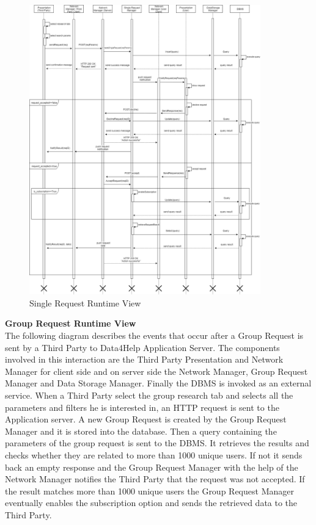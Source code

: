 \documentclass[titlepage]{article}
\begin{document}
\begin{figure}[H]
	\center
  	\includegraphics[width=10cm]{SingleRequest.png} %
  	\caption{Single Request Runtime View}
 	\label{fig:SIGREQ}
\end{figure}


{\bf Group Request Runtime View }\\ 
The following diagram describes the events that occur after a Group Request is sent by a Third Party to Data4Help Application Server. The components involved in this interaction are the Third Party Presentation and Network Manager for client side and  on server side the Network Manager, Group Request Manager and Data Storage Manager. Finally the DBMS is invoked as an external service.
When a Third Party select the group research tab and selects all the parameters and filters he is interested in, an HTTP request is sent to the Application server. A new Group Request is created by the Group Request Manager and it is stored into the database. Then a query containing the parameters of the group request is sent to the DBMS. It retrieves the results and checks whether they are related to more than 1000 unique users. If not it sends back an empty response and the Group Request Manager with the help of the Network Manager notifies the Third Party that the request was not accepted. If the result matches more than 1000 unique users the Group Request Manager eventually enables the subscription option and sends the retrieved data to the Third Party.
\end{document}
